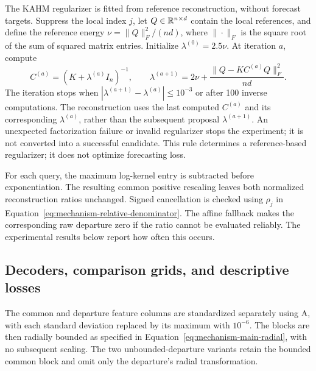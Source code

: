 The KAHM regularizer is fitted from reference reconstruction, without
forecast targets. Suppress the local index $j$, let $Q\in\mathbb{R}^{n\times d}$
contain the local references, and define the reference energy
$\nu=\|Q\|_F^2/(nd)$, where $\|\cdot\|_F$ is the square root of the
sum of squared matrix entries. Initialize $\lambda^{(0)}=2.5\nu$.
At iteration $a$, compute
\[
 C^{(a)}=(K+\lambda^{(a)}I_n)^{-1},\qquad
 \lambda^{(a+1)}=2\nu+
     \frac{\|Q-KC^{(a)}Q\|_F^2}{nd}.
\]
The iteration stops when
$|\lambda^{(a+1)}-\lambda^{(a)}|\le10^{-3}$ or after 100 inverse
computations. The reconstruction uses the last computed $C^{(a)}$ and
its corresponding $\lambda^{(a)}$, rather than the subsequent proposal
$\lambda^{(a+1)}$. An unexpected factorization failure or invalid
regularizer stops the experiment; it is not converted into a successful
candidate. This rule determines a reference-based
regularizer; it does not optimize forecasting loss.

For each query, the maximum log-kernel entry is subtracted before
exponentiation. The resulting common positive rescaling leaves both
normalized reconstruction ratios unchanged. Signed cancellation is
checked using $\rho_j$ in Equation~\eqref{eq:mechanism-relative-denominator}.
The affine fallback makes the corresponding raw departure zero if the ratio
cannot be evaluated reliably. The experimental results below report how
often this occurs.

\subsection{Decoders, comparison grids, and descriptive losses}

The common and departure feature columns are standardized separately
using A, with each standard deviation replaced by its maximum with
$10^{-6}$. The blocks are then radially bounded as specified in
Equation~\eqref{eq:mechanism-main-radial}, with no subsequent scaling.
The two unbounded-departure variants retain the bounded common block
and omit only the departure's radial transformation.

